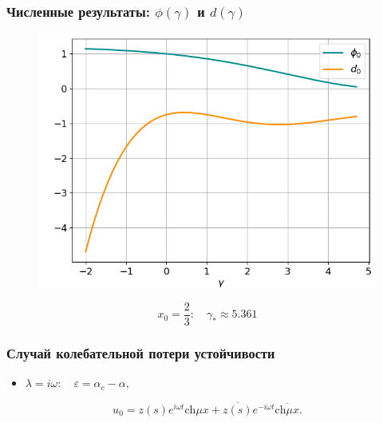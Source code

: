 \documentclass[fullscreen=true, unicode, bookmarks=false]{beamer}
\begin{document}
\begin{frame}
\frametitle{ Численные результаты: $ \phi(\gamma) $ и $ d(\gamma) $ }

\begin{figure} 
\includegraphics[scale=0.53]{divergent_phi0d0_23.png}  
\end{figure}

$$ x_0 = \frac{2}{3}: \quad \gamma_* \approx 5.361 $$

\end{frame}

\begin{frame}
\frametitle{ Случай колебательной потери устойчивости }

\begin{itemize}
\item { $ \lambda = i \omega: \quad \varepsilon=\alpha_c-\alpha, $
}
\end{itemize}

\bigskip

\begin{equation}
	u_0 = z(s) e^{i \omega t} \mbox{ch} \mu x + \overline{z(s)} e^{-i \omega t} \overline{\mbox{ch} \mu x}.
\end{equation}

\end{frame}
\end{document}
